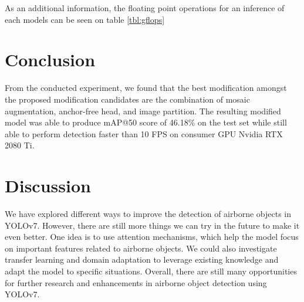 \documentclass[conference]{IEEEtran}
\begin{document}
As an additional information, the floating point operations for an inference of each models can be seen on table \ref{tbl:gflops}
\begin{table}
  \centering
  \label{tbl:latency}
  
\end{table}

\begin{table}
  \centering
  \label{tbl:gflops}
  
\end{table}
\section{Conclusion}
From the conducted experiment, we found that the best modification amongst the 
proposed modification candidates are the combination of mosaic augmentation, anchor-free head, and image partition.
The resulting modified model was able to produce mAP@50 score of 46.18\% on the test set while still able to
perform detection faster than 10 FPS on consumer GPU Nvidia RTX 2080 Ti.

\section{Discussion}
We have explored different ways to improve the detection of airborne objects in YOLOv7.
However, there are still more things we can try in the future to make it even better.
One idea is to use attention mechanisms, which help the model focus on important features related to airborne objects.
We could also investigate transfer learning and domain adaptation to leverage existing knowledge and adapt the model to specific situations.
Overall, there are still many opportunities for further research and enhancements in airborne object detection using YOLOv7.

\end{document}
